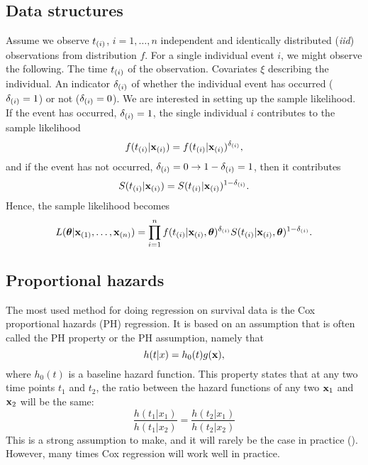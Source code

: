 \subsection{Data structures}\label{sec:surv-data}
Assume we observe $t_{(i)}$, $i=1,\dotsc,n$ independent and identically distributed (\textit{iid}) observations from distribution $f$. For a single individual event $i$, we might observe the following. The time $t_{(i)}$ of the observation. Covariates $\xi$ describing the individual. An indicator $\delta_{(i)}$ of whether the individual event has occurred ($\delta_{(i)} = 1$) or not ($\delta_{(i)} = 0$). We are interested in setting up the sample likelihood. If the event has occurred, $\delta_{(i)}=1$, the single individual $i$ contributes to the sample likelihood
\begin{equation*}
    f(t_{(i)}|\mathbf{x}_{(i)})=f(t_{(i)}|\mathbf{x}_{(i)})^{\delta_{(i)}},
\end{equation*}
and if the event has not occurred, $\delta_{(i)}=0\rightarrow1-\delta_{(i)}=1$, then it contributes
\begin{equation*}
    S(t_{(i)}|\mathbf{x}_{(i)})=S(t_{(i)}|\mathbf{x}_{(i)})^{1-\delta_{(i)}}.
\end{equation*}
Hence, the sample likelihood becomes
\begin{equation}\label{eq:surv-lik}
    L(\boldsymbol{\theta}|\mathbf{x}_{(1)},\ldots,\mathbf{x}_{(n)})=\prod_{i=1}^n f(t_{(i)}|\mathbf{x}_{(i)},\boldsymbol{\theta})^{\delta_{(i)}} S(t_{(i)}|\mathbf{x}_{(i)},\boldsymbol{\theta})^{1-\delta_{(i)}}.
\end{equation}
\subsection{Proportional hazards}
The most used method for doing regression on survival data is the Cox proportional hazards (PH) regression. It is based on an assumption that is often called the PH property or the PH assumption, namely that
\begin{equation}
    h(t|x)=h_0(t)g(\mathbf{x}),
\end{equation}
where $h_0(t)$ is a baseline hazard function.  This property states that at any two time points $t_1$ and $t_2$, the ratio between the hazard functions of any two $\mathbf{x}_1$ and $\mathbf{x}_2$ will be the same:
\begin{equation}
    \frac{h(t_1|x_1)}{h(t_1|x_2)}=\frac{h(t_2|x_1)}{h(t_2|x_2)}
\end{equation}
This is a strong assumption to make, and it will rarely be the case in practice (\cite{lee2010}). However, many times Cox regression will work well in practice. 

